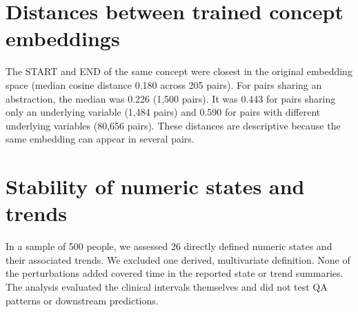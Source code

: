 ﻿\documentclass[11pt,a4paper]{article}
\begin{document}
\section{Distances between trained concept embeddings}
The START and END of the same concept were closest in the original embedding space (median cosine distance 0.180 across 205 pairs). For pairs sharing an abstraction, the median was 0.226 (1,500 pairs). It was 0.443 for pairs sharing only an underlying variable (1,484 pairs) and 0.590 for pairs with different underlying variables (80,656 pairs). These distances are descriptive because the same embedding can appear in several pairs.

\section{Stability of numeric states and trends}
In a sample of 500 people, we assessed 26 directly defined numeric states and their associated trends. We excluded one derived, multivariate definition. None of the perturbations added covered time in the reported state or trend summaries. The analysis evaluated the clinical intervals themselves and did not test QA patterns or downstream predictions.
\begin{table}[htbp]\centering\small\caption{Agreement in the labels assigned to covered time and proportion of baseline coverage lost. Noise is expressed relative to local threshold spacing. Intervals use 2,000 valid resamples.}\resizebox{\linewidth}{!}{}\end{table}
\clearpage
\end{document}

